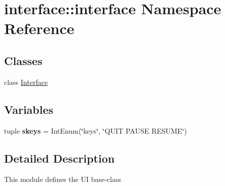\hypertarget{namespaceinterface_1_1interface}{\section{interface\-:\-:interface \-Namespace \-Reference}
\label{namespaceinterface_1_1interface}
}
\subsection*{\-Classes}
\begin{DoxyCompactItemize}
\item 
class \hyperlink{classinterface_1_1interface_1_1_interface}{\-Interface}
\end{DoxyCompactItemize}
\subsection*{\-Variables}
\begin{DoxyCompactItemize}
\item 
\hypertarget{namespaceinterface_1_1interface_a5935a37d161693bd98169d1bfe6560d0}{tuple {\bfseries skeys} = \-Int\-Enum(\char`\"{}keys\char`\"{}, \char`\"{}\-Q\-U\-I\-T \-P\-A\-U\-S\-E \-R\-E\-S\-U\-M\-E\char`\"{})}\label{namespaceinterface_1_1interface_a5935a37d161693bd98169d1bfe6560d0}

\end{DoxyCompactItemize}


\subsection{\-Detailed \-Description}
\begin{DoxyVerb}
    This module defines the UI base-class
\end{DoxyVerb}
 